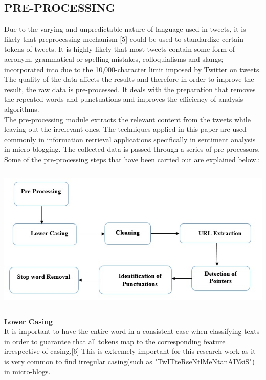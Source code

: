 \documentclass[a4paper,12pt]{report}
\begin{document}
\subsection{PRE-PROCESSING}
\hspace*{\parindent}Due to the varying and unpredictable nature of language used in tweets, it is likely that preprocessing mechanism [5] could be used to standardize certain tokens of tweets. It is highly likely that most tweets contain some form of acronym, grammatical or spelling mistakes, colloquialisms and slangs; incorporated into due to the 10,000-character limit imposed by Twitter on tweets.\\
\hspace*{\parindent}The quality of the data affects the results and therefore in order to improve the result, the raw data is pre-processed. It deals with the preparation that removes the repeated words and punctuations and improves the efficiency of analysis algorithms.\\
\hspace*{\parindent} The pre-processing module extracts the relevant content from the tweets while leaving out the irrelevant ones. The techniques applied in this paper are used commonly in information retrieval applications specifically in sentiment analysis in micro-blogging. The collected data is passed through a series of pre-processors.\\
\hspace*{\parindent} Some of the pre-processing steps that have been carried out are explained below.: 
\begin{center}
	\includegraphics[height=7cm,width=16cm]{images/processingmoldule.jpg}
\end{center}
\textbf{Lower Casing }\\
\hspace*{\parindent} It is important to have the entire word in a consistent case when classifying texts in order to guarantee that all tokens map to the corresponding feature irrespective of casing.[6] This is extremely important for this research work as it is very common to find irregular casing(such as "TwITteRseNtlMeNtanAIYsiS") in micro-blogs.\\
\end{document}
